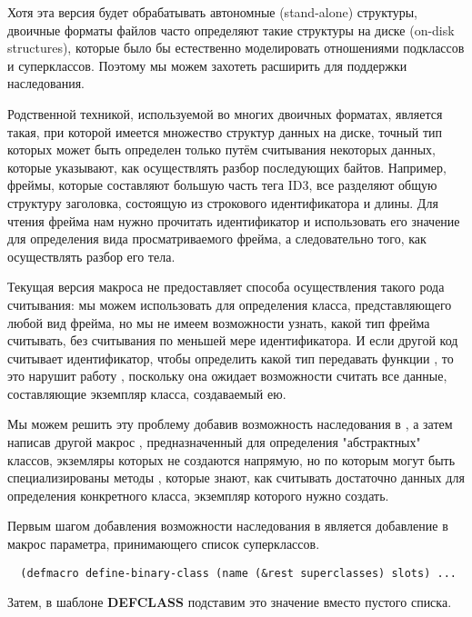 Хотя эта версия  будет обрабатывать автономные (stand-alone)
структуры, двоичные форматы файлов часто определяют такие структуры на диске (on-disk
structures), которые было бы естественно моделировать отношениями подклассов и
суперклассов. Поэтому мы можем захотеть расширить  для поддержки
наследования.

Родственной техникой, используемой во многих двоичных форматах, является такая, при
которой имеется множество структур данных на диске, точный тип которых может быть
определен только путём считывания некоторых данных, которые указывают, как осуществлять
разбор последующих байтов. Например, фреймы, которые составляют большую часть тега ID3,
все разделяют общую структуру заголовка, состоящую из строкового идентификатора и
длины. Для чтения фрейма нам нужно прочитать идентификатор и использовать его значение для
определения вида просматриваемого фрейма, а следовательно того, как осуществлять разбор
его тела.

Текущая версия макроса  не предоставляет способа осуществления
такого рода считывания: мы можем использовать  для определения
класса, представляющего любой вид фрейма, но мы не имеем возможности узнать, какой тип
фрейма считывать, без считывания по меньшей мере идентификатора. И если другой код
считывает идентификатор, чтобы определить какой тип передавать функции ,
то это нарушит работу , поскольку она ожидает возможности считать все
данные, составляющие экземпляр класса, создаваемый ею.

Мы можем решить эту проблему добавив возможность наследования в
, а затем написав другой макрос
, предназначенный для определения "абстрактных" классов,
экземляры которых не создаются напрямую, но по которым могут быть специализированы методы
, которые знают, как считывать достаточно данных для определения
конкретного класса, экземпляр которого нужно создать.

Первым шагом добавления возможности наследования в  является
добавление в макрос параметра, принимающего список суперклассов.

\begin{lstlisting}
  (defmacro define-binary-class (name (&rest superclasses) slots) ...
\end{lstlisting}

Затем, в шаблоне \textbf{DEFCLASS} подставим это значение вместо пустого списка.

